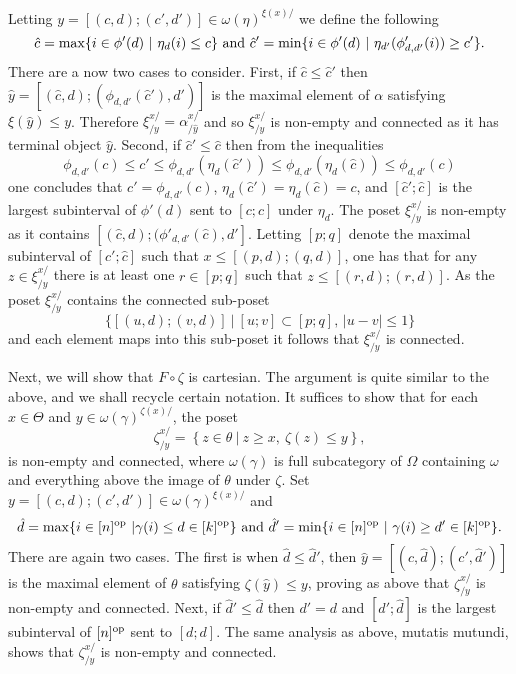 \documentclass[a4paper]{article}
\numberwithin{equation}{section}
\begin{document}
Letting $y=[(c,d);(c',d')]\in \omega(\eta)^{\xi(x)/}$ we define the following
\begin{equation*}
 \hat{c} = \max \{i \in \phi'(d) \ | \ \eta_d(i) \leq c\} \ {\rm and} \ \hat{c}' = \min \{i \in \phi'(d) \ | \ \eta_{d'}(\phi'_{d,d'}(i)) \geq c'\}. 
\end{equation*}
There are a now two cases to consider. First, if $\hat{c} \leq \hat{c}'$ then $\hat{y} = [(\hat{c},d); (\phi_{d,d'}(\hat{c}'),d')]$ is the maximal element of $\alpha$ satisfying $\xi(\hat{y})\leq y$. Therefore $\xi^{x/}_{/y} = \alpha^{x/}_{/\hat{y}}$ and so $\xi^{x/}_{/y}$ is non-empty and connected as it has terminal object $\hat{y}$. Second, if $\hat{c}' \leq \hat{c}$ then from the inequalities
\begin{equation*}
 \phi_{d,d'}(c) \leq c' \leq \phi_{d,d'}\left(\eta_d(\hat{c}')\right) \leq \phi_{d,d'}\left( \eta_d(\hat{c})\right) \leq \phi_{d,d'}(c)
\end{equation*}
one concludes that $c'=\phi_{d,d'}(c)$, $\eta_d(\hat{c}') = \eta_d(\hat{c}) = c$, and $[\hat{c}';\hat{c}]$ is the largest subinterval of $\phi'(d)$ sent to $[c;c]$ under $\eta_d$. The poset $\xi^{x/}_{/y}$ is non-empty as it contains $[(\hat{c},d);(\phi'_{d,d'}(\hat{c}),d']$. Letting $[p;q]$ denote the maximal subinterval of $[\hat{c}';\hat{c}]$ such that $x \leq [(p,d);(q,d)]$, one has that for any $z \in \xi^{x/}_{/y}$ there is at least one $r \in [p;q]$ such that $z \leq [(r,d);(r,d)]$. As the poset $\xi^{x/}_{/y}$ contains the connected sub-poset 
\begin{equation*}
 \{[(u,d);(v,d)] \ | \ [u;v] \subset [p;q], \, |u-v|\leq 1\}
\end{equation*}
and each element maps into this sub-poset it follows that $\xi^{x/}_{/y}$ is connected.

Next, we will show that $F \circ \zeta$ is cartesian. The argument is quite similar to the above, and we shall recycle certain notation. It suffices to show that for each $x \in \Theta$ and $y \in \omega(\gamma)^{\zeta(x)/}$, the poset
\begin{equation*}
 \zeta^{x/}_{/y} = \left\{ z \in \theta \ | \ z \geq x, \ \zeta(z) \leq y \right\},
\end{equation*}
is non-empty and connected, where $\omega(\gamma)$ is full subcategory of $\Omega$ containing $\omega$ and everything above the image of $\theta$ under $\zeta$. Set $y = [(c,d);(c',d')] \in \omega(\gamma)^{\xi(x)/}$ and
\begin{equation*}
 \hat{d} = \max \{i \in [n]^{\rm op} \ | \gamma(i) \leq d \in [k]^{\rm op}\} \ {\rm and} \ \hat{d}' = \min \{i \in [n]^{\rm op} \ | \ \gamma(i) \geq d' \in [k]^{\rm op}\}.
\end{equation*}
There are again two cases. The first is when $\hat{d} \leq \hat{d}'$, then $\hat{y} = [(c,\hat{d});(c',\hat{d}')]$ is the maximal element of $\theta$ satisfying $\zeta(\hat{y})\leq y$, proving as above that $\zeta^{x/}_{/y}$ is non-empty and connected. Next, if $\hat{d}' \leq \hat{d}$ then $d'=d$ and $[\hat{d}';\hat{d}]$ is the largest subinterval of $[n]^{\rm op}$ sent to $[d;d]$. The same analysis as above, mutatis mutundi, shows that $\zeta^{x/}_{/y}$ is non-empty and connected.
\end{document}
